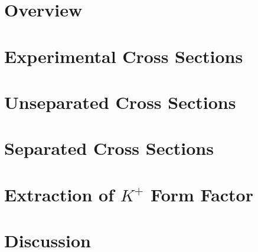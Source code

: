 \label{Chapter-8}

\hypertarget{Section-8.1}{%
\section{Overview}\label{Section-8.1}}

\hypertarget{Section-8.2}{%
\section{Experimental Cross Sections}\label{Section-8.2}}

\hypertarget{Section-8.3}{%
\section{Unseparated Cross Sections}\label{Section-8.3}}

\hypertarget{Section-8.4}{%
\section{Separated Cross Sections}\label{Section-8.4}}

\hypertarget{Section-8.5}{%
\section{\texorpdfstring{Extraction of \(K^{+}\) Form
Factor}{Extraction of K\^{}\{+\} Form Factor}}\label{Section-8.5}}

\hypertarget{Section-8.6}{%
\section{Discussion}\label{Section-8.6}}


